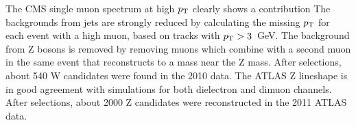 The CMS single muon spectrum at high $\mbox{$p_{\mathrm{T}}$}$ clearly shows a contribution
The backgrounds from jets are strongly reduced by calculating the missing $\mbox{$p_{\mathrm{T}}$}$ for each event with a
high \pT muon, based on tracks with $\mbox{$p_{\mathrm{T}}$}>3$~GeV.  The background from Z bosons is removed by removing muons which
combine with a second muon in the same event that reconstructs to a mass near the Z mass.
After selections, about 540 W candidates were found in the 2010 \PbPb data.
%
The ATLAS Z lineshape is in good agreement with simulations for both
dielectron and dimuon channels.
After selections, about 2000 Z candidates were reconstructed in the 2011 ATLAS \PbPb data.

